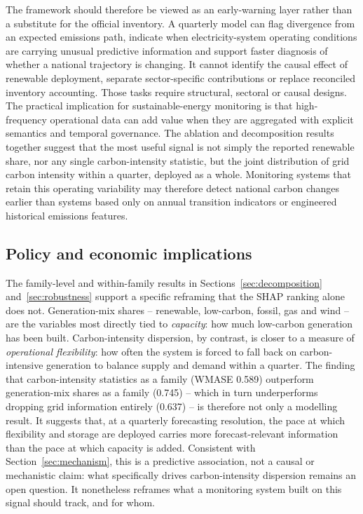 \documentclass[preprint,12pt]{elsarticle}
\begin{document}
The framework should therefore be viewed as an early-warning layer rather than a substitute for the official inventory. A quarterly model can flag divergence from an expected emissions path, indicate when electricity-system operating conditions are carrying unusual predictive information and support faster diagnosis of whether a national trajectory is changing. It cannot identify the causal effect of renewable deployment, separate sector-specific contributions or replace reconciled inventory accounting. Those tasks require structural, sectoral or causal designs. The practical implication for sustainable-energy monitoring is that high-frequency operational data can add value when they are aggregated with explicit semantics and temporal governance. The ablation and decomposition results together suggest that the most useful signal is not simply the reported renewable share, nor any single carbon-intensity statistic, but the joint distribution of grid carbon intensity within a quarter, deployed as a whole. Monitoring systems that retain this operating variability may therefore detect national carbon changes earlier than systems based only on annual transition indicators or engineered historical emissions features.

\subsection{Policy and economic implications}\label{sec:policy}

The family-level and within-family results in Sections~\ref{sec:decomposition} and~\ref{sec:robustness} support a specific reframing that the SHAP ranking alone does not. Generation-mix shares -- renewable, low-carbon, fossil, gas and wind -- are the variables most directly tied to \emph{capacity}: how much low-carbon generation has been built. Carbon-intensity dispersion, by contrast, is closer to a measure of \emph{operational flexibility}: how often the system is forced to fall back on carbon-intensive generation to balance supply and demand within a quarter. The finding that carbon-intensity statistics as a family (WMASE 0.589) outperform generation-mix shares as a family (0.745) -- which in turn underperforms dropping grid information entirely (0.637) -- is therefore not only a modelling result. It suggests that, at a quarterly forecasting resolution, the pace at which flexibility and storage are deployed carries more forecast-relevant information than the pace at which capacity is added. Consistent with Section~\ref{sec:mechanism}, this is a predictive association, not a causal or mechanistic claim: what specifically drives carbon-intensity dispersion remains an open question. It nonetheless reframes what a monitoring system built on this signal should track, and for whom.
\end{document}
